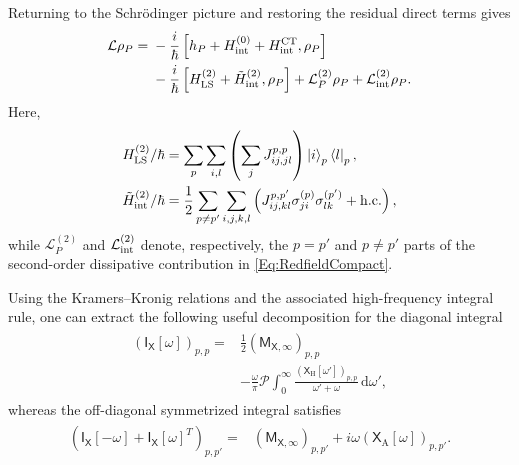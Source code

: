 \documentclass[prx,aps,twocolumn,article]{revtex4-2}
\newcommand{\msf}[1]{\mathsf{#1}}
\newcommand{\hc}{\mathrm{h.c.}}
\newcommand{\msIX}{\msf{I}_\msf{X}}
\newcommand{\msM}{\msf{M}}
\newcommand{\msXA}{\msX_\mathrm{A}}
\newcommand{\msXH}{\msX_\mathrm{H}}
\newcommand{\msX}{\msf{X}}
\begin{document}
Returning to the Schr\"odinger picture and restoring the residual direct
terms gives
\begin{align}
\begin{aligned}
    \mathcal L\rho_P
    ={}&
    -\frac{i}{\hbar}
    \left[
        h_P
        +H_{\mathrm{int}}^{(0)}
        +H_{\mathrm{int}}^{\mathrm{CT}},
        \rho_P
    \right]
    \\
    &-
    \frac{i}{\hbar}
    \left[
        H_{\rm LS}^{(2)}
        +\tilde{H}_{\rm int}^{(2)},
        \rho_P
    \right]
    +
    \mathcal L_P^{(2)}\rho_P
    +
    \mathcal L_{\rm int}^{(2)}\rho_P.
\end{aligned}
\label{Eq:FullME}
\end{align}
Here,
\begin{align}
\begin{aligned}
    H_{\rm LS}^{(2)}/\hbar
    &=
    \sum_p\sum_{i,l}
    \left(
        \sum_j J_{ij,jl}^{p,p}
    \right)
    \ket{i}_p\bra{l}_p,
    \\
    \tilde{H}_{\rm int}^{(2)}/\hbar
    &=
    \frac{1}{2}
    \sum_{p\neq p'}
    \sum_{i,j,k,l}
    \left(
        J_{ij,kl}^{p,p'}
        \sigma_{ji}^{(p)}
        \sigma_{lk}^{(p')}
        +\hc
    \right),
\end{aligned}
\end{align}
while $\mathcal L_P^{(2)}$ and
$\mathcal L_{\rm int}^{(2)}$ denote, respectively, the $p=p'$ and
$p\neq p'$ parts of the second-order dissipative contribution in
\cref{Eq:RedfieldCompact}.


Using the Kramers--Kronig relations and the associated high-frequency integral rule, one can extract the following useful decomposition for the diagonal integral
\begin{align}
\begin{aligned}
    \left(
        \msIX[\omega]
    \right)_{p,p}
    ={}&
    \frac{1}{2}
    \left(
        \msM_{\msX,\infty}
    \right)_{p,p}
    \\
    &-
    \frac{\omega}{\pi}
    \mathcal P\!\int_0^\infty
    \frac{
        \left(
            \msXH[\omega']
        \right)_{p,p}
    }{
        \omega'+\omega
    }
    \,\mathrm d\omega',
\end{aligned}
\label{Eq:IntegralDecomposition}
\end{align}
whereas the off-diagonal symmetrized integral satisfies
\begin{align}
\begin{aligned}
    \left(
        \msIX[-\omega]
        +
        \msIX[\omega]^T
    \right)_{p,p'}
    =&
    \left(
        \msM_{\msX,\infty}
    \right)_{p,p'}+
    i\omega
    \left(
        \msXA[\omega]
    \right)_{p,p'}.
\end{aligned}
\label{Eq:AppPVCoherentCouplingResult}
\end{align}
\end{document}
